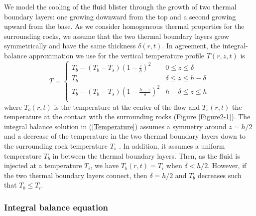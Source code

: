 We model  the cooling of the  fluid blister through the  growth of two
thermal  boundary layers:  one growing  downward  from the  top and  a
second  growing upward  from  the base.   As  we consider  homogeneous
thermal properties for  the surrounding rocks, we assume  that the two
thermal boundary layers grow symmetrically and have the same thickness
$\delta(r,t)$.   In agreement,  the integral-balance  approximation we
use for the vertical temperature profile $T(r,z,t)$ is
\begin{equation}
  T=
  \begin{cases}
    T_b - (T_b-T_s)(1-\frac{z}{\delta})^2 & 0 \le z\le \delta \\
    T_b & \delta \le z\le h-\delta \\
    T_b - (T_b-T_s)(1-\frac{h-z}{\delta})^2 & h-\delta \le z\le h\\
  \end{cases}
  \label{Temperature}
\end{equation}
where $T_b(r,t)$  is the  temperature at  the center  of the  flow and
$T_s(r,t)$ the temperature at the contact with the surrounding rocks (Figure
\ref{Figure2-1}).      The     integral    balance     solution     in
(\ref{Temperature}) assumes  a symmetry around $z=h/2$  and a decrease
of the  temperature in  the two  thermal boundary  layers down  to the
surrounding  rock  temperature   $T_s$  \citep{BALMFORTH:2004fm}.   In
addition,  it  assumes a  uniform  temperature  $T_b$ in  between  the
thermal  boundary  layers.   Then,  as  the fluid  is  injected  at  a
temperature  $T_i$,   we  have  $T_b(r,t)  =T_i$   when  $\delta<h/2$.
However,   if  the   two   thermal  boundary   layers  connect,   then
$\delta  =  h/2$ and  $T_b$  decreases  such  that $T_b\le  T_i$. 

\subsubsection{Integral balance equation}
\label{sec:integr-balance-equat}

